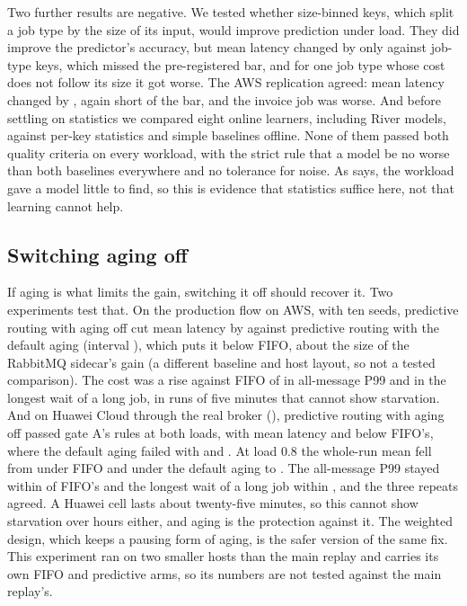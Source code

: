 

Two further results are negative. We tested whether size-binned keys, which split a job type by the size of its input, would
improve prediction under load. They did improve the predictor's accuracy, but mean latency changed by only \SizeBinsMeanCI{}
against job-type keys, which missed the pre-registered bar, and for one job type whose cost does not follow its size it got
\SizeBinsInvoiceAbs{} worse. The AWS replication agreed: mean latency changed by \SizeBinsAwsMeanCI{}, again short of the bar, and the invoice job was \SizeBinsAwsInvoiceAbs{} worse. And before settling on statistics we compared eight online learners, including River models,
against per-key statistics and simple baselines offline. None of them passed both quality criteria on every workload, with
the strict rule that a model be no worse than both baselines everywhere and no tolerance for noise. As 
says, the workload gave a model little to find, so this is evidence that statistics suffice here, not that learning cannot help.

\subsection{Switching aging off}\label{sec:agingoff}

If aging is what limits the gain, switching it off should recover it. Two experiments test that. On the production flow on AWS, with ten seeds, predictive routing with aging off cut mean latency by \BaseNoAgingVsPredAbs{} against predictive routing with the default aging (interval \BaseNoAgingVsPredCI{}), which puts it \BaseNoAgingVsFifoAbs{} below FIFO, about the size of the RabbitMQ sidecar's gain (a different baseline and host layout, so not a tested comparison). The cost was a rise against FIFO of \BaseNoAgingPNinetyNineAbs{} in all-message P99 and \BaseNoAgingLongWaitAbs{} in the longest wait of a long job, in runs of five minutes that cannot show starvation. And on Huawei Cloud through the real broker (), predictive routing with aging off passed gate A's rules at both loads, with mean latency \AgingReplayNEightAbs{} and \AgingReplayNNinetyFiveAbs{} below FIFO's, where the default aging failed with \AgingReplayAEightAbs{} and \AgingReplayANinetyFiveAbs{}. At load 0.8 the whole-run mean fell from \AgingReplayFifoMeanEight{} under FIFO and \AgingReplayPredMeanEight{} under the default aging to \AgingReplayNoAgingMeanEight{}. The all-message P99 stayed within \AgingReplayNPNinetyNineNinetyFive{} of FIFO's and the longest wait of a long job within \AgingReplayNLongEight{}, and the three repeats agreed. A Huawei cell lasts about twenty-five minutes, so this cannot show starvation over hours either, and aging is the protection against it. The weighted design, which keeps a pausing form of aging, is the safer version of the same fix. This experiment ran on two smaller hosts than the main replay and carries its own FIFO and predictive arms, so its numbers are not tested against the main replay's.

